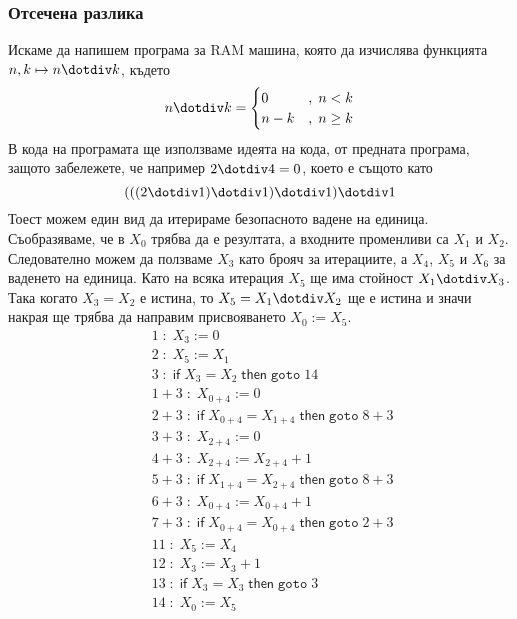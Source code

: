 \documentclass[14pt]{extarticle}
\begin{document}
\subsubsection*{Отсечена разлика}
Искаме да напишем програма за RAM машина, която да изчислява функцията \(n, k \mapsto n \dotdiv k\),
където
\begin{align*}
    n \dotdiv k = \begin{cases}
    0 &,\; n < k \\
    n - k &,\; n \geq k
    \end{cases}
\end{align*}
В кода на програмата ще използваме идеята на кода, от предната програма,
защото забележете, че например \(2 \dotdiv 4 = 0\), което е същото като
\[(((2 \dotdiv 1) \dotdiv 1) \dotdiv 1) \dotdiv 1\]
Тоест можем един вид да итерираме безопасното вадене на единица.
Съобразяваме, че в \(X_0\) трябва да е резултата, а входните променливи са \(X_1\) и \(X_2\).
Следователно можем да ползваме \(X_3\) като брояч за итерациите, а \(X_4\), \(X_5\) и \(X_6\) за ваденето на единица.
Като на всяка итерация \(X_5\) ще има стойност \(X_1 \dotdiv X_3\). Така когато \(X_3 = X_2\) е истина, то \(X_5 = X_1 \dotdiv X_2\) ще е истина и значи накрая ще трябва да направим присвояването \(X_0 := X_5\). 
\begin{align*}
    & \quad 1 \; : \; X_3 := 0 \\
    & \quad 2 \; : \; X_5 := X_1 \\
    & \quad 3 \; : \; \mathsf{if} \; X_3 = X_2 \; \mathsf{then} \; \mathtt{goto} \; 14 \\
    & \quad 1 + 3 \; : \; X_{0 + 4} := 0 \\
    & \quad 2 + 3 \; : \; \mathsf{if} \; X_{0 + 4} = X_{1 + 4} \; \mathsf{then} \; \mathtt{goto} \; 8 + 3 \\
    & \quad 3 + 3 \; : \; X_{2 + 4} := 0 \\
    & \quad 4 + 3 \; : \; X_{2 + 4} := X_{2 + 4} + 1 \\
    & \quad 5 + 3 \; : \; \mathsf{if} \;  X_{1 + 4} = X_{2 + 4} \; \mathsf{then} \; \mathtt{goto} \; 8 + 3 \\
    & \quad 6 + 3 \; : \; X_{0 + 4} := X_{0 + 4} + 1\\
    & \quad 7 + 3 \; : \; \mathsf{if} \; X_{0 + 4} = X_{0 + 4} \; \mathsf{then} \; \mathtt{goto} \; 2 + 3 \\
    & \quad 11 \; : \; X_5 := X_4 \\
    & \quad 12 \; : \; X_3 := X_3 + 1 \\
    & \quad 13 \; : \; \mathsf{if} \; X_3 = X_3 \; \mathsf{then} \; \mathtt{goto} \; 3 \\
    & \quad 14 \; : \; X_0 := X_5
\end{align*}
\end{document}
